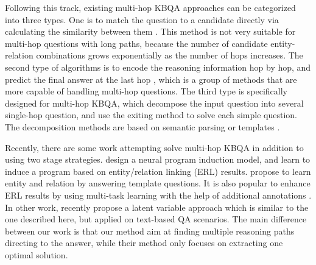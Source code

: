 Following this track, existing multi-hop KBQA approaches can be categorized into three types. One is to match the question to a candidate directly via calculating the similarity between them \cite{DBLP:journals/corr/abs-1801-09893,DBLP:conf/adbis/YuHYZW18,DBLP:conf/ijcai/LanW019}. This method is not very suitable for multi-hop questions with long paths, because the number of candidate entity-relation combinations grows exponentially as the number of hops increases. The second type of algorithms is to encode the reasoning information hop by hop, and predict the final answer at the last hop \cite{DBLP:conf/emnlp/MillerFDKBW16,DBLP:conf/coling/ZhouHZ18,DBLP:conf/naacl/ChenCCNK19}, which is a group of methods that are more capable of handling multi-hop questions. The third type is specifically designed for multi-hop KBQA, which decompose the input question into several single-hop question, and use the exiting method to solve each simple question. The decomposition methods are based on semantic parsing \cite{DBLP:conf/www/AbujabalYRW17,DBLP:conf/emnlp/LuoLLZ18} or templates \cite{DBLP:journals/corr/abs-1908-11053}.

Recently, there are some work attempting solve multi-hop KBQA in addition to using two stage strategies.  design a neural program induction model, and learn to induce a program based on entity/relation linking (ERL) results.  propose to learn entity and relation by answering template questions. It is also popular to enhance ERL results by using multi-task learning with the help of additional annotations \cite{DBLP:conf/aaai/DengXLYDFLS19,DBLP:conf/ijcai/ShaoGBJCLD19}. In other work,  recently propose a latent variable approach which is similar to the one described here, but applied on text-based QA scenarios. The main difference between our work is that our method aim at finding multiple reasoning paths directing to the answer, while their method only focuses on extracting one optimal solution.
